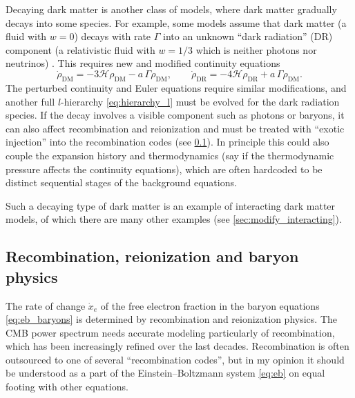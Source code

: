 \documentclass[USenglish, thumbmarks]{uiophdthesis} %
\newcommand\EB{Einstein--Boltzmann}
\newcommand\calH{\mathcal{H}}
\begin{document}
Decaying dark matter is another class of models,
where dark matter gradually decays into some species.
For example, some models assume that dark matter (a fluid with $w=0$) decays with rate $\Gamma$
into an unknown \enquote{dark radiation} (DR) component (a relativistic fluid with $w=1/3$ which is neither photons nor neutrinos)
\cite[e.g.][]{audrenStrongestModelindependentBound2014a,poulinFreshLookLinear2016,bringmannConvertingNonrelativisticDark2018}.
This requires new and modified continuity equations
\begin{equation}
\dot\rho_\mathrm{DM} = -3\calH \rho_\mathrm{DM} - a \, \Gamma \rho_\mathrm{DM},
\qquad
\dot\rho_\mathrm{DR} = -4\calH \rho_\mathrm{DR} + a \, \Gamma \rho_\mathrm{DM}.
\end{equation}
The perturbed continuity and Euler equations require similar modifications,
and another full $l$-hierarchy \eqref{eq:hierarchy_l} must be evolved for the dark radiation species.
If the decay involves a visible component such as photons or baryons,
it can also affect recombination and reionization \cite[e.g.][]{chenParticleDecaysCosmic2004}
and must be treated with \enquote{exotic injection} into the recombination codes (see \cref{sec:modify_baryons}).
In principle this could also couple the expansion history and thermodynamics
(say if the thermodynamic pressure affects the continuity equations),
which are often hardcoded to be distinct sequential stages of the background equations.

Such a decaying type of dark matter is an example of interacting dark matter models,
of which there are many other examples (see \cref{sec:modify_interacting}).

\subsection{Recombination, reionization and baryon physics}
\label{sec:modify_baryons}

The rate of change $\dot{x}_e$ of the free electron fraction in the baryon equations \eqref{eq:eb_baryons}
is determined by recombination and reionization physics.
The CMB power spectrum needs accurate modeling particularly of recombination,
which has been increasingly refined over the last decades.
Recombination is often outsourced to one of several \enquote{recombination codes},
but in my opinion it should be understood as a part of the \EB{} system \eqref{eq:eb}
on equal footing with other equations.
\end{document}
